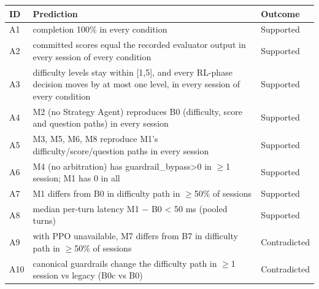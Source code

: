\begin{tabular}{l>{\raggedright\arraybackslash}p{7.6cm}l}
\toprule
ID & Prediction & Outcome\\
\midrule
A1 & completion 100\% in every condition & Supported \\
A2 & committed scores equal the recorded evaluator output in every session of every condition & Supported \\
A3 & difficulty levels stay within [1,5], and every RL-phase decision moves by at most one level, in every session of every condition & Supported \\
A4 & M2 (no Strategy Agent) reproduces B0 (difficulty, score and question paths) in every session & Supported \\
A5 & M3, M5, M6, M8 reproduce M1's difficulty/score/question paths in every session & Supported \\
A6 & M4 (no arbitration) has guardrail\_bypass>0 in $\ge$1 session; M1 has 0 in all & Supported \\
A7 & M1 differs from B0 in difficulty path in $\ge$50\% of sessions & Supported \\
A8 & median per-turn latency M1 $-$ B0 < 50 ms (pooled turns) & Supported \\
A9 & with PPO unavailable, M7 differs from B7 in difficulty path in $\ge$50\% of sessions & Contradicted \\
A10 & canonical guardrails change the difficulty path in $\ge$1 session vs legacy (B0c vs B0) & Contradicted \\
\bottomrule
\end{tabular}
